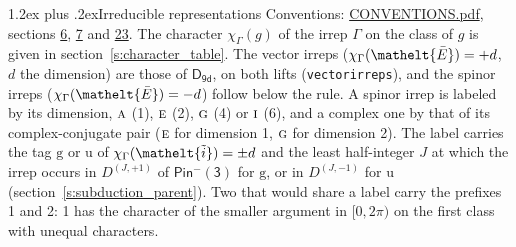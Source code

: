 \documentclass[10pt,a4paper]{article}
\makeatletter
\renewcommand\section{\@startsection{section}{1}{\z@}{-3ex plus -1ex minus -.2ex}%
  {1.2ex plus .2ex}{\normalfont\large\sffamily\bfseries\color{parttitle}}}
\numberwithin{equation}{section}
\newcommand{\eltfont}[1]{{\let\sigma\eltsigma\mathelt{#1}}}
\newcommand{\grp}[1]{\mathsf{#1}}
\newcommand{\irr}[1]{\text{\normalfont\scshape #1}}
\newcommand{\elt}[1]{\eltfont{#1}}
\newcommand{\ptag}[1]{\mathrm{#1}}
\newcommand{\irrJp}[2]{D^{(#1,#2)}}
\newcommand{\irchar}[1]{\chi_{#1}}
\newcommand{\barred}[1]{\bar{#1}}
\newcommand{\lift}[1]{\tilde{#1}}
\makeatother
\begin{document}
\section{Irreducible representations}\label{s:irreps}
Conventions: \href{../../CONVENTIONS.pdf}{CONVENTIONS.pdf}, sections \href{../../../rotation/CONVENTIONS.pdf\#conv.6}{6}, \href{../../../rotation/CONVENTIONS.pdf\#conv.7}{7} and \href{../../CONVENTIONS.pdf\#conv.23}{23}.
\leavevmode\label{n:function.character}\label{n:irrep.Gamma}The character $\irchar{\Gamma}(g)$ of the irrep $\Gamma$ on the class of $g$ is given in section~\ref{s:character_table}. \label{n:index.dimension}The vector irreps ($\irchar{\Gamma}(\elt{\barred{E}}) = +d$, $d$ the dimension) are those of \href{../../../rotation/data/pdf/D9d.pdf}{$\grp{D_{9d}}$}, on both lifts (\texttt{vectorirreps}), and the spinor irreps ($\irchar{\Gamma}(\elt{\barred{E}}) = -d$) follow below the rule. A spinor irrep is labeled by its dimension, $\irr{a}$ (1), $\irr{e}$ (2), $\irr{g}$ (4) or $\irr{i}$ (6), and a complex one by that of its complex-conjugate pair ($\irr{e}$ for dimension 1, $\irr{g}$ for dimension 2). The label carries the tag $\ptag{g}$ or $\ptag{u}$ of $\irchar{\Gamma}(\elt{\lift{i}}) = \pm d$ and the least half-integer $J$ at which the irrep occurs in $\irrJp{J}{+1}$ of $\grp{Pin^{-}(3)}$ for $\ptag{g}$, or in $\irrJp{J}{-1}$ for $\ptag{u}$ (section~\ref{s:subduction_parent}). Two that would share a label carry the prefixes 1 and 2: 1 has the character of the smaller argument in $[0, 2\pi)$ on the first class with unequal characters.
\end{document}
